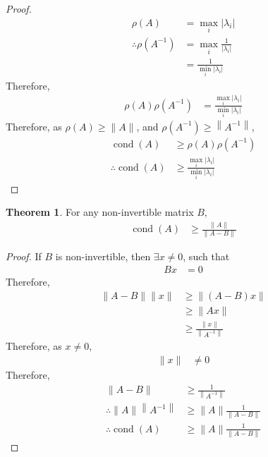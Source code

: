 \documentclass[fleqn, a4paper, 12pt, twoside, titlepage]{article}
\theoremstyle{definition}
\theoremstyle{theorem}
\newtheorem{theorem}{Theorem}
\DeclareMathOperator{\cond}{cond}
\begin{document}
\begin{proof}
	\begin{align*}
		\rho(A) &= \max\limits_{i} |\lambda_i|\\
		\therefore \rho\left( A^{-1} \right) &= \max\limits_{i} \frac{1}{|\lambda_i|}\\
		&= \frac{1}{\min\limits_{i} |\lambda_i|}
	\end{align*}
	Therefore,
	\begin{align*}
		\rho(A) \rho\left( A^{-1} \right) &= \frac{\max\limits_{i} |\lambda_i|}{\min\limits_{i} |\lambda_i|}
	\end{align*}
	Therefore, as $\rho(A) \ge \|A\|$, and $\rho\left( A^{-1} \right) \ge \left\| A^{-1} \right\|$,
	\begin{align*}
		\cond(A) &\ge \rho(A) \rho\left( A^{-1} \right)\\
		\therefore \cond(A) &\ge \frac{\max\limits_{i} |\lambda_i|}{\min\limits_{i} |\lambda_i|}
	\end{align*}
\end{proof}

\begin{theorem}
	For any non-invertible matrix $B$,
	\begin{align*}
		\cond(A) &\ge \frac{\|A\|}{\|A - B\|}
	\end{align*}
\end{theorem}

\begin{proof}
	If $B$ is non-invertible, then $\exists x \neq 0$, such that
	\begin{align*}
		B x &= 0
	\end{align*}
	Therefore,
	\begin{align*}
		\|A - B\| \|x\| &\ge \left\| (A - B) x \right\|\\
		&\ge \|A x\|\\
		&\ge \frac{\|x\|}{\left\| A^{-1} \right\|}
	\end{align*}
	Therefore, as $x \neq 0$,
	\begin{align*}
		\|x\| &\neq 0
	\end{align*}
	Therefore,
	\begin{align*}
		\|A - B\| &\ge \frac{1}{\left\| A^{-1} \right\|}\\
		\therefore \|A\| \left\| A^{-1} \right\| &\ge \|A\| \frac{1}{\|A - B\|}\\
		\therefore \cond(A) &\ge \|A\| \frac{1}{\|A - B\|}
	\end{align*}
\end{proof}
\end{document}

